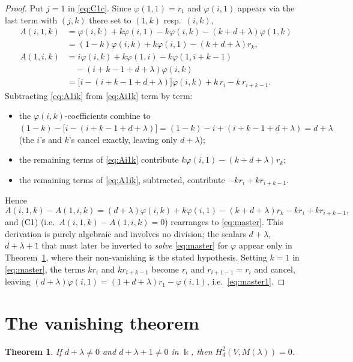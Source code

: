 \documentclass[11pt,reqno]{amsart}
\theoremstyle{plain}
\newtheorem{theorem}{Theorem}[section]
\theoremstyle{definition}
\newcommand{\kk}{\Bbbk}
\newcommand{\Ht}{H^2}
\begin{document}
\begin{proof}
Put $j=1$ in \eqref{eq:C1c}. Since $\varphi(1,1)=r_1$ and $\varphi(i,1)$ appears via the
last term with $(j,k)$ there set to $(1,k)$ resp.\ $(i,k)$,
\begin{align}
A(i,1,k)&=\varphi(i,k)+k\varphi(i,1)-k\varphi(i,k)-(k+d+\lambda)\varphi(1,k)\nonumber\\
&=(1-k)\varphi(i,k)+k\varphi(i,1)-(k+d+\lambda)r_k,\label{eq:Ai1k}\\
A(1,i,k)&=i\varphi(i,k)+k\varphi(1,i)-k\varphi(1,i+k-1)\nonumber\\
&\quad-(i+k-1+d+\lambda)\varphi(i,k)\nonumber\\
&=\bigl[i-(i+k-1+d+\lambda)\bigr]\varphi(i,k)+k\,r_i-k\,r_{i+k-1}.\label{eq:A1ik}
\end{align}
Subtracting \eqref{eq:A1ik} from \eqref{eq:Ai1k} term by term:
\begin{itemize}[leftmargin=2em]
\item the $\varphi(i,k)$-coefficients combine to
$(1-k)-\bigl[i-(i+k-1+d+\lambda)\bigr]=(1-k)-i+(i+k-1+d+\lambda)=d+\lambda$
(the $i$'s and $k$'s cancel exactly, leaving only $d+\lambda$);
\item the remaining terms of \eqref{eq:Ai1k} contribute $k\varphi(i,1)-(k+d+\lambda)r_k$;
\item the remaining terms of \eqref{eq:A1ik}, subtracted, contribute $-kr_i+kr_{i+k-1}$.
\end{itemize}
Hence
\[
A(i,1,k)-A(1,i,k)=(d+\lambda)\varphi(i,k)+k\varphi(i,1)-(k+d+\lambda)r_k-kr_i+kr_{i+k-1},
\]
and (C1) (i.e.\ $A(i,1,k)-A(1,i,k)=0$) rearranges to \eqref{eq:master}. This derivation is
purely algebraic and involves no division; the scalars $d+\lambda$, $d+\lambda+1$ that must
later be inverted to \emph{solve} \eqref{eq:master} for $\varphi$ appear only in
Theorem~\ref{thm:vanish}, where their non-vanishing is the stated hypothesis. Setting $k=1$ in
\eqref{eq:master}, the terms $kr_i$ and $kr_{i+k-1}$ become $r_i$ and $r_{i+1-1}=r_i$ and
cancel, leaving $(d+\lambda)\varphi(i,1)=(1+d+\lambda)r_1-\varphi(i,1)$, i.e.\
\eqref{eq:master1}.
\end{proof}

\section{The vanishing theorem}\label{sec:vanish}

\begin{theorem}\label{thm:vanish}
If $d+\lambda\ne0$ and $d+\lambda+1\ne0$ in $\kk$, then $\Ht_d(V,M(\lambda))=0$.
\end{theorem}
\end{document}
